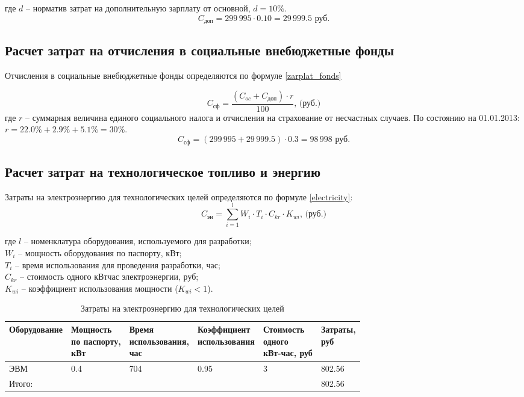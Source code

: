где $d$ – норматив затрат на дополнительную зарплату от основной, $d=10\%$.
$$
	C_\textit{доп}  = 299\,995 \cdot 0.10 = 29\,999.5 \mbox{ руб.}
$$

\subsection{Расчет затрат на отчисления в социальные внебюджетные фонды}
Отчисления в социальные внебюджетные фонды определяются по формуле \ref{zarplat_fonds}

\begin{equation}
	C_\textit{сф} = \frac{(C_{oc} + C_\textit{доп}) \cdot r}{100} \mbox{, (руб.)}
	\label{zarplat_fonds}
\end{equation} 
где $r$ – суммарная величина единого социального налога  и отчисления на страхование от несчастных случаев. По состоянию на 01.01.2013: $r = 22.0\%	+ 2.9\% + 5.1\% = 30\%$.
$$
	C_\textit{сф} = (299\,995 + 29\,999.5)\cdot 0.3 = 98\,998 \mbox{ руб.}
$$

\subsection{Расчет затрат на технологическое топливо и энергию}
Затраты на электроэнергию для технологических целей определяются по формуле \ref{electricity}:
\begin{equation}
	C_\textit{эн} = \sum_{i=1}^l W_i \cdot T_i \cdot C_{kr} \cdot K_{wi} \mbox{, (руб.)}
	\label{electricity}
\end{equation}

где  $l$ – номенклатура оборудования, используемого для разработки;\\
$W_i$ – мощность оборудования по паспорту, кВт;\\
$T_i$ – время использования для проведения разработки, час;\\
$C_{kr}$ – стоимость одного кВт\textperiodcentered час электроэнергии, руб;\\
$K_{wi}$ – коэффициент использования мощности ($K_{wi} < 1$).\\

\begin{table}[h]
	\caption{Затраты на электроэнергию для технологических целей}
	\begin{tabular}{|l|l|l|l|l|l|}
		\hline
			Оборудование & \thead{Мощность\\ по паспорту,\\кВт} & \thead{Время\\использования,\\час} & \thead{Коэффициент\\использования} & \thead{Стоимость\\одного\\кВт-час, руб} &  \thead{Затраты,\\руб} \\
		\hline
			ЭВМ & 0.4 & 704 & 0.95 & 3 & 802.56 \\
		\hline
			Итого: & & & & & 802.56 \\
		\hline		
	\end{tabular}
\end{table}

